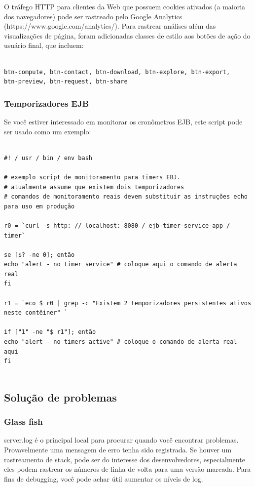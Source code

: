 \documentclass[12pt,hidelinks]{article}
\begin{document}
\qquad O tráfego HTTP para clientes da Web que possuem cookies ativados (a maioria dos navegadores) pode ser rastreado pelo Google Analytics (https://www.google.com/analytics/). Para rastrear análises além das visualizações de página, foram adicionadas classes de estilo aos botões de ação do usuário final, que incluem:

\begin{verbatim}

btn-compute, btn-contact, btn-download, btn-explore, btn-export, 
btn-preview, btn-request, btn-share

\end{verbatim}

\subsubsection{Temporizadores EJB}

\qquad Se você estiver interessado em monitorar os cronômetros EJB, este script pode ser usado como um exemplo:

\begin{verbatim}

#! / usr / bin / env bash

# exemplo script de monitoramento para timers EBJ.
# atualmente assume que existem dois temporizadores
# comandos de monitoramento reais devem substituir as instruções echo
para uso em produção

r0 = `curl -s http: // localhost: 8080 / ejb-timer-service-app / timer`

se [$? -ne 0]; então
echo "alert - no timer service" # coloque aqui o comando de alerta real
fi

r1 = `eco $ r0 | grep -c "Existem 2 temporizadores persistentes ativos
neste contêiner" `

if ["1" -ne "$ r1"]; então
echo "alert - no timers active" # coloque o comando de alerta real aqui
fi
 
\end{verbatim}
 
\subsection{Solução de problemas}

\subsubsection{Glass fish}

\qquad server.log é o principal local para procurar quando você encontrar problemas. Provavelmente uma mensagem de erro tenha sido registrada. Se houver um rastreamento de stack, pode ser do interesse dos desenvolvedores, especialmente eles podem rastrear os números de linha de volta para uma versão marcada. Para fins de debugging, você pode achar útil aumentar os níveis de log.
\end{document}
